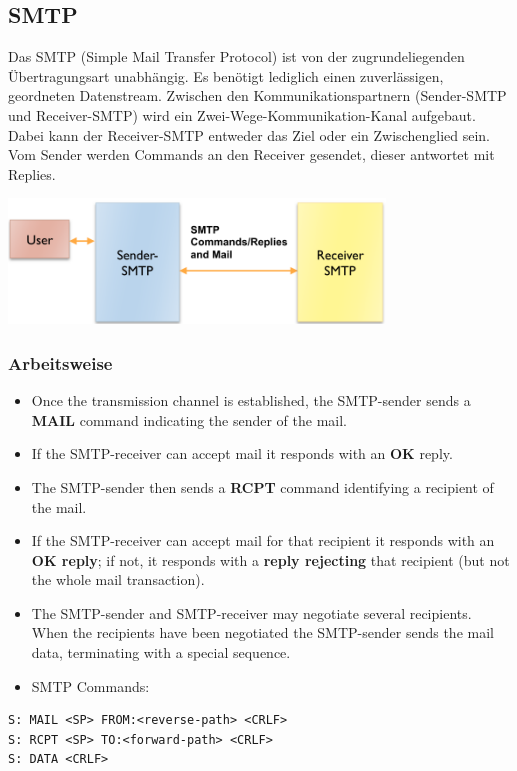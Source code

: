 \documentclass{article} %
\begin{document}
\subsection{SMTP}
Das SMTP (Simple Mail Transfer Protocol) ist von der zugrundeliegenden Übertragungsart unabhängig. Es benötigt lediglich einen zuverlässigen, geordneten Datenstream. Zwischen den Kommunikationspartnern (Sender-SMTP und Receiver-SMTP) wird ein Zwei-Wege-Kommunikation-Kanal aufgebaut. Dabei kann der Receiver-SMTP entweder das Ziel oder ein Zwischenglied sein. Vom Sender werden Commands an den Receiver gesendet, dieser antwortet mit Replies. 
\begin{center}
	\includegraphics[width=10cm]{img/smtp.png}
\end{center}
\subsubsection{Arbeitsweise}
	\begin{itemize}
	\item Once the transmission channel is established, the SMTP-sender sends a \textbf{MAIL} command indicating the sender of the mail. 
	\item If the SMTP-receiver can accept mail it responds with an \textbf{OK} reply.
	\item The SMTP-sender then sends a \textbf{RCPT} command identifying a recipient of the mail. 
	\item If the SMTP-receiver can accept mail for that recipient it responds with an \textbf{OK reply}; if not, it responds with a \textbf{reply rejecting} that recipient (but not the whole mail transaction). 
	\item The SMTP-sender and SMTP-receiver may negotiate several recipients. When the recipients have been negotiated the SMTP-sender sends the mail data, terminating with a special sequence.  
	\item SMTP Commands:
	\end{itemize}
	\begin{verbatim}
S: MAIL <SP> FROM:<reverse-path> <CRLF> 
S: RCPT <SP> TO:<forward-path> <CRLF> 
S: DATA <CRLF> 
	\end{verbatim}
\end{document}
